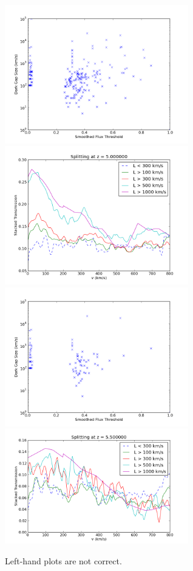 \documentclass[11pt]{article}
\begin{document}
\begin{figure}[h]
  \centering
  \includegraphics[width=8cm]{LvsT.png}
  \includegraphics[width=8cm]{Stack_Zgreaterthan5.png}
  \includegraphics[width=8cm]{LvsT_zGreaterThan5p5.png}
  \includegraphics[width=8cm]{Stack_Zgreaterthan5p5.png}
  \caption{Left-hand plots are not correct.}
  \label{fig:todo}
\end{figure}
\end{document}
